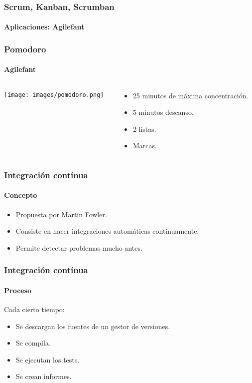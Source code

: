   \begin{frame}
   \frametitle{Scrum, Kanban, Scrumban}
   \framesubtitle{Aplicaciones: Agilefant}
   \begin{center}
   \end{center}

  \end{frame}

  \begin{frame}
   \frametitle{Pomodoro}
   \framesubtitle{Agilefant}

   \begin{columns}
    \begin{column}{4cm}
     \texttt{[image: images/pomodoro.png]}
    \end{column}
    \begin{column}{7cm}
     \begin{itemize}
      \item<1-> 25 minutos de máxima concentración.
      \item<2-> 5 minutos descanso.
      \item<3-> 2 listas.
      \item<4-> Marcas.
     \end{itemize}
    \end{column}
   \end{columns}
  \end{frame}

  \begin{frame}
   \frametitle{Integración contínua}
   \framesubtitle{Concepto}

   \begin{itemize}
    \item Propuesta por Martin Fowler.
    \item Consiste en hacer integraciones automáticas contínuamente.
    \item Permite detectar problemas mucho antes.
   \end{itemize}
  \end{frame}

  \begin{frame}
   \frametitle{Integración contínua}
   \framesubtitle{Proceso}

   Cada cierto tiempo:

   \begin{itemize}
    \item<+-> Se descargan los fuentes de un gestor de versiones.
    \item<+-> Se compila.
    \item<+-> Se ejecutan los tests.
    \item<+-> Se crean informes.
   \end{itemize}
  \end{frame}

